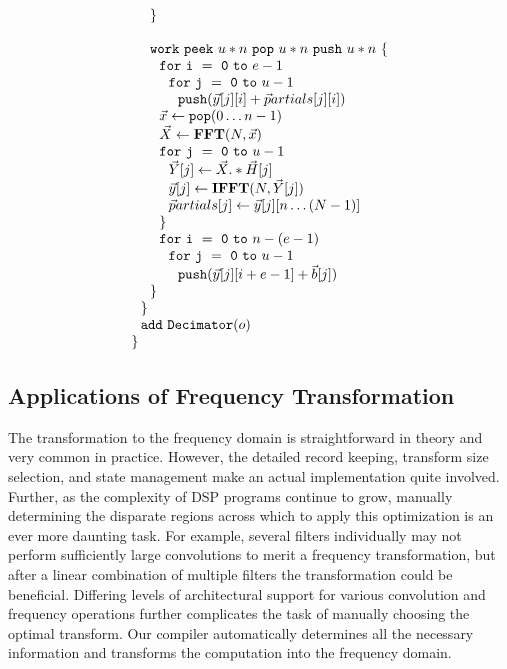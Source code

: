 \begin{transformation}
\begin{equation}
\begin{array}{ll}
    ~~~~{\tt \}} \\
    \\
    ~~~~{\tt work}~{\tt peek}~u*n~{\tt pop}~u*n~{\tt push}~u*n~{\tt \{} \\
    ~~~~~~{\tt for~i~=~0~to~}e-1\\
    ~~~~~~~~{\tt for~j~=~0~to~}u-1\\
    ~~~~~~~~~~{\tt push}(\vec{y}[j][i] + {\vec partials}[j][i])\\
    ~~~~~~\vec{x} \leftarrow {\tt pop}(0 \dots n - 1) \\
    ~~~~~~\vec{X} \leftarrow \mathbf{FFT} (N, \vec{x}) \\
    ~~~~~~{\tt for~j~=~0~to~}u-1\\
    ~~~~~~~~\vec{Y}[j] \leftarrow \vec{X} .* \vec{H}[j] \\
    ~~~~~~~~\vec{y}[j] \leftarrow \mathbf{IFFT}(N, \vec{Y}[j]) \\
    ~~~~~~~~{\vec partials}[j] \leftarrow \vec{y}[j][n \dots (N-1)]\\
    ~~~~~~{\tt \}} \\
    ~~~~~~{\tt for~i~=~0~to~}n-(e-1)\\
    ~~~~~~~~{\tt for~j~=~0~to~}u-1\\
    ~~~~~~~~~~{\tt push}(\vec{y}[j][i+e-1] + {\vec b}[j])\\
    ~~~~{\tt \}} \\
    ~~{\tt \}} \\
    ~~{\tt add~Decimator}(o) \\
    {\tt \}} \\
  \end{array}
\end{equation}
\label{trans:freq1}
\end{transformation}

\subsection{Applications of Frequency Transformation}

The transformation to the frequency domain is straightforward in
theory and very common in practice. However, the detailed record
keeping, transform size selection, and state management make an actual
implementation quite involved.  Further, as the complexity of DSP
programs continue to grow, manually determining the disparate regions
across which to apply this optimization is an ever more daunting task.
For example, several filters individually may not perform sufficiently
large convolutions to merit a frequency transformation, but after a
linear combination of multiple filters the transformation could be
beneficial.  Differing levels of architectural support for various
convolution and frequency operations further complicates the task of
manually choosing the optimal transform.  Our compiler automatically
determines all the necessary information and transforms the
computation into the frequency domain.

